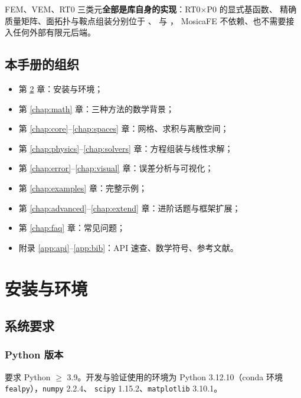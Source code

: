 \documentclass[UTF8,11pt,oneside]{ctexbook}
\theoremstyle{definition}
\theoremstyle{plain}
\newenvironment{important}{%
  \begin{tcolorbox}[colback=blue!5,colframe=blue!45,title=要点,fonttitle=\bfseries]%
}{%
  \end{tcolorbox}%
}
\newcommand{\mosica}{\textsf{MosicaFE}}
\newcommand{\code}[1]{\texttt{#1}}
\begin{document}
\begin{important}
FEM、VEM、RT0 三类元\textbf{全部是库自身的实现}：RT0$\times$P0 的显式基函数、
精确质量矩阵、面拓扑与鞍点组装分别位于 、
 与 ，
\mosica{} 不依赖、也不需要接入任何外部有限元后端。
\end{important}

\section{本手册的组织}

\begin{itemize}[itemsep=0.2em]
  \item 第 \ref{chap:install} 章：安装与环境；
  \item 第 \ref{chap:math} 章：三种方法的数学背景；
  \item 第 \ref{chap:core}--\ref{chap:spaces} 章：网格、求积与离散空间；
  \item 第 \ref{chap:physics}--\ref{chap:solvers} 章：方程组装与线性求解；
  \item 第 \ref{chap:error}--\ref{chap:visual} 章：误差分析与可视化；
  \item 第 \ref{chap:examples} 章：完整示例；
  \item 第 \ref{chap:advanced}--\ref{chap:extend} 章：进阶话题与框架扩展；
  \item 第 \ref{chap:faq} 章：常见问题；
  \item 附录 \ref{app:api}--\ref{app:bib}：API 速查、数学符号、参考文献。
\end{itemize}

\chapter{安装与环境}
\label{chap:install}

\section{系统要求}

\subsection{Python 版本}

要求 Python $\ge$ 3.9。开发与验证使用的环境为
Python 3.12.10（conda 环境 \code{fealpy}），\code{numpy} 2.2.4、
\code{scipy} 1.15.2、\code{matplotlib} 3.10.1。
\end{document}
